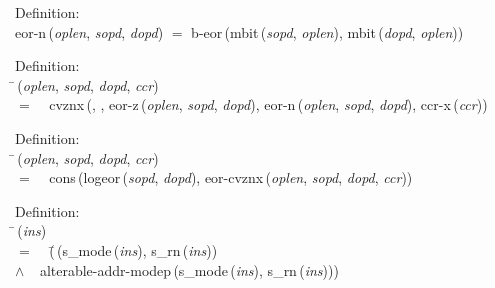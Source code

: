 \begin{tabbing}{\sc Definition}: \\  
{\rm{eor-n}}\,({\it{oplen\/}}, {\it{sopd\/}}, {\it{dopd\/}}) $=$ {\rm{b-eor}}\,({\rm{mbit}}\,({\it{sopd\/}}, {\it{oplen\/}}), {\rm{mbit}}\,({\it{dopd\/}}, {\it{oplen\/}}))
\end{tabbing}

\begin{tabbing}{\sc Definition}: \\  
\=\,({\it{oplen\/}}, {\it{sopd\/}}, {\it{dopd\/}}, {\it{ccr\/}}) \\ 
$=$$\;\;\;\;${\rm{cvznx}}\,({}, {}, {\rm{eor-z}}\,({\it{oplen\/}}, {\it{sopd\/}}, {\it{dopd\/}}), {\rm{eor-n}}\,({\it{oplen\/}}, {\it{sopd\/}}, {\it{dopd\/}}), {\rm{ccr-x}}\,({\it{ccr\/}}))\-
\end{tabbing}

\begin{tabbing}{\sc Definition}: \\  
\=\,({\it{oplen\/}}, {\it{sopd\/}}, {\it{dopd\/}}, {\it{ccr\/}}) \\ 
$=$$\;\;\;\;${\rm{cons}}\,({\rm{logeor}}\,({\it{sopd\/}}, {\it{dopd\/}}), {\rm{eor-cvznx}}\,({\it{oplen\/}}, {\it{sopd\/}}, {\it{dopd\/}}, {\it{ccr\/}}))\-
\end{tabbing}

\begin{tabbing}{\sc Definition}: \\  
\=\,({\it{ins\/}}) \\ 
$=$$\;\;\;\;$(\=\,({\rm{s\_mode}}\,({\it{ins\/}}), {\rm{s\_rn}}\,({\it{ins\/}})) \\ 
$\wedge$$\;\;\;\;${\rm{alterable-addr-modep}}\,({\rm{s\_mode}}\,({\it{ins\/}}), {\rm{s\_rn}}\,({\it{ins\/}})))\-\-
\end{tabbing}

